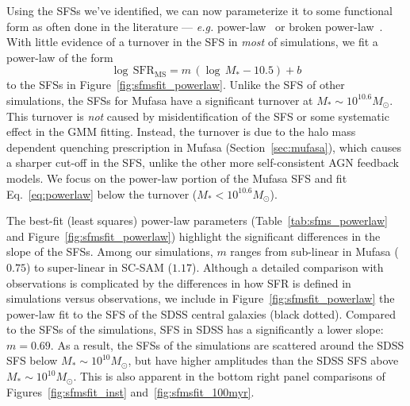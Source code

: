 \documentclass[tighten, preprint]{aastex62}
\begin{document}
Using the SFSs we've identified, we can now parameterize it to 
some functional form as often done in the literature --- \emph{e.g.} 
power-law~\citep{speagle2014} or broken power-law~\citep{lee2015}. With 
little evidence of a turnover in the SFS in {\em most} of simulations, 
we fit a power-law of the form 
\begin{equation} \label{eq:powerlaw}
\log\,\mathrm{SFR}_\mathrm{MS} = m\,(\log\,M_* - 10.5) + b
\end{equation}
to the SFSs in Figure~\ref{fig:sfmsfit_powerlaw}. Unlike the SFS of 
other simulations, the SFSs for {\sc Mufasa} have a significant 
turnover at $M_*{\sim}10^{10.6}M_\odot$. This turnover is \emph{not} 
caused by  misidentification of the SFS or some systematic effect in the 
GMM fitting. {\color{red} Instead, the turnover is due to the halo mass 
dependent quenching prescription in {\sc Mufasa} (Section~\ref{sec:mufasa}), 
which causes a sharper cut-off in the SFS, unlike the other more 
self-consistent AGN feedback models. We focus on the power-law portion 
of the {\sc Mufasa} SFS and fit Eq.~\ref{eq:powerlaw} below the turnover 
($M_*{<}10^{10.6} M_\odot$).} 

{\color{red}
The best-fit (least squares) power-law parameters (Table~\ref{tab:sfms_powerlaw} 
and Figure~\ref{fig:sfmsfit_powerlaw}) highlight the significant
differences in the slope of the SFSs. Among our simulations, $m$ ranges 
from sub-linear in {\sc Mufasa} ($0.75$) to super-linear in SC-SAM ($1.17$).
Although a detailed comparison with observations is complicated by the 
differences in how SFR is defined in simulations versus observations, 
we include in Figure~\ref{fig:sfmsfit_powerlaw} the power-law fit to the 
SFS of the SDSS central galaxies (black dotted). Compared to the SFSs of the 
simulations, SFS in SDSS has a significantly a lower slope: $m=0.69$. As a 
result, the SFSs of the simulations are scattered around the SDSS SFS 
below $M_*{\sim}10^{10} M_\odot$, but have higher amplitudes than the SDSS SFS 
above $M_*{\sim}10^{10} M_\odot$. This is also apparent in the bottom right 
panel comparisons of Figures~\ref{fig:sfmsfit_inst} and~\ref{fig:sfmsfit_100myr}. 
}
\end{document}
